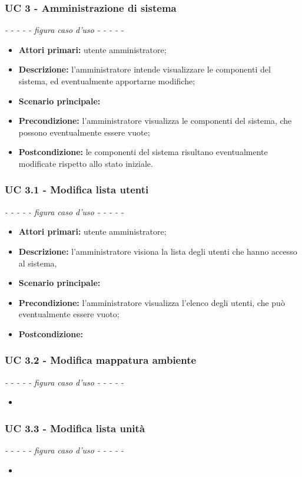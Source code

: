 \subsubsection{UC 3 - Amministrazione di sistema}
	\textit{- - - - - figura caso d'uso - - - - -}
	\begin{itemize}
		\item \textbf{Attori primari:} utente amministratore;
		\item \textbf{Descrizione:} l'amministratore intende visualizzare le componenti del sistema, ed eventualmente apportarne modifiche;
		\item \textbf{Scenario principale:} 
		\item \textbf{Precondizione:} l'amministratore visualizza le componenti del sistema, che possono eventualmente essere vuote;
		\item \textbf{Postcondizione:} le componenti del sistema risultano eventualmente modificate rispetto allo stato iniziale.
	\end{itemize}
	
\subsubsection{UC 3.1 - Modifica lista utenti}
	\textit{- - - - - figura caso d'uso - - - - -}
	\begin{itemize}
		\item \textbf{Attori primari:} utente amministratore;
		\item \textbf{Descrizione:} l'amministratore visiona la lista degli utenti che hanno accesso al sistema, 
		\item \textbf{Scenario principale:} 
		\item \textbf{Precondizione:} l'amministratore visualizza l'elenco degli utenti, che può eventualmente essere vuoto;
		\item \textbf{Postcondizione:} 
	\end{itemize}

\subsubsection{UC 3.2 - Modifica mappatura ambiente}
	\textit{- - - - - figura caso d'uso - - - - -}
	\begin{itemize}
		\item
	\end{itemize}

\subsubsection{UC 3.3 - Modifica lista unità}
	\textit{- - - - - figura caso d'uso - - - - -}
	\begin{itemize}
		\item
	\end{itemize}



